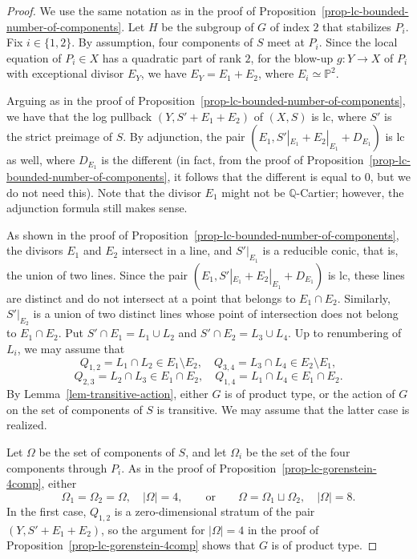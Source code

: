 \documentclass[11pt]{amsart}
\numberwithin{equation}{section}
\theoremstyle{definition}
\theoremstyle{remark}
\begin{document}
\begin{proof}
We use the same notation as in the proof of Proposition~\ref{prop-lc-bounded-number-of-components}. 
Let $H$ be the subgroup of $G$ of index $2$ that stabilizes $P_i$. 
Fix $i\in\{1,2\}$. 
By assumption, four components of $S$ meet at $P_i$. 
Since the local equation of $P_i\in X$ has a quadratic part of rank $2$, for the blow-up $g\colon Y\to X$ of $P_i$ with exceptional divisor $E_Y$, we have $E_Y=E_1+E_2$, where $E_i\simeq \mathbb{P}^2$. 

Arguing as in the proof of Proposition~\ref{prop-lc-bounded-number-of-components}, we have that the log pullback $(Y, S' + E_1+E_2)$ of $(X, S)$ is lc, where $S'$ is the strict preimage of $S$. By adjunction, the pair $(E_1, S'|_{E_1}+E_2|_{E_1}+D_{E_1})$ is lc as well, where $D_{E_1}$ is the different (in fact, from the proof of Proposition~\ref{prop-lc-bounded-number-of-components}, it follows that the different is equal to $0$, but we do not need this). Note that the divisor $E_1$ might not be $\mathbb{Q}$-Cartier; however, the adjunction formula still makes sense. 

As shown in the proof of Proposition~\ref{prop-lc-bounded-number-of-components}, the divisors $E_1$ and $E_2$ intersect in a line, and $S'|_{E_1}$ is a reducible conic, that is, the union of two lines. 
Since the pair $(E_1, S'|_{E_1}+E_2|_{E_1}+D_{E_1})$ is lc, these lines are distinct and do not intersect at a point that belongs to $E_1\cap E_2$. 
Similarly, $S'|_{E_2}$ is a union of two distinct lines whose point of intersection does not belong to $E_1\cap E_2$.  
Put $S'\cap E_1=L_{1}\cup L_{2}$ and $S'\cap E_2=L_{3}\cup L_{4}$. 
Up to renumbering of $L_i$, we may assume that
\[Q_{1,2}=L_1\cap L_2\in E_1\setminus E_2,  \quad Q_{3,4}=L_3\cap L_4\in E_2\setminus E_1,
\] 
\[
Q_{2,3}=L_2\cap L_3\in E_1\cap E_2,  \quad Q_{1,4}=L_1\cap L_4\in E_1\cap E_2.
\] 
By Lemma~\ref{lem-transitive-action}, either $G$ is of product type, or the action of $G$ on the set of components of $S$ is transitive. We may assume that the latter case is realized. 

Let $\Omega$ be the set of components of $S$, and let $\Omega_i$ be the set of the four components through $P_i$. As in the proof of Proposition~\ref{prop-lc-gorenstein-4comp}, either
\[
\Omega_1=\Omega_2=\Omega,\quad |\Omega|=4,
\qquad\text{or}\qquad
\Omega=\Omega_1\sqcup\Omega_2,\quad |\Omega|=8.
\]
In the first case, $Q_{1,2}$ is a zero-dimensional stratum of the pair $(Y,S'+E_1+E_2)$, so the argument for $|\Omega|=4$ in the proof of Proposition~\ref{prop-lc-gorenstein-4comp} shows that $G$ is of product type.


\end{proof}
\end{document}
